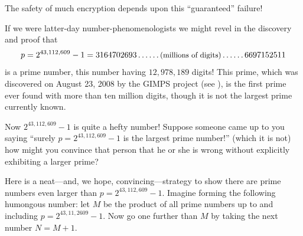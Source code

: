 \documentclass[openany]{book}
\theoremstyle{plain}
\theoremstyle{definition}
\begin{document}




The safety of much
encryption depends upon this ``guaranteed'' failure! 

If we were latter-day number-phenomenologists we might revel in the
discovery and proof that
$$
  p=2^{43,112,609}-1 = 3164702693\ldots\ldots\text{\small (millions of digits)}\ldots\ldots6697152511
$$
is a prime number, this number having $12{,}978{,}189$ digits!  This
prime, which was discovered on August 23, 2008 by the GIMPS project
(see ),
is the first prime ever found with more than ten million digits,
though it is not the largest prime currently known.

Now $2^{43,112,609}-1$ is quite a hefty number! Suppose someone came
up to you saying ``surely $p = 2^{43,112,609}-1$ is the largest prime
number!'' (which it is not) how might you convince that person that
he or she is wrong without explicitly exhibiting a larger prime?


Here is a neat---and, we hope, convincing---strategy to show there are
prime numbers even larger than $p = 2^{43,112,609} - 1$. Imagine
forming the following humongous number: let $M$ be the product of all
prime numbers up to and including $p = 2^{43,11,2609} - 1$.  Now go
one further than $M$ by taking the next number $N=M+1$.
\end{document}
